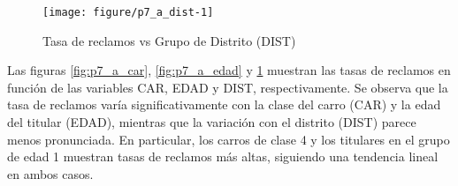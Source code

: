 \documentclass[paper=letter, fontsize=11pt, draft=false]{scrartcl}\usepackage[]{graphicx}\usepackage[]{xcolor}
\makeatletter
\def\maxwidth{ %
  \ifdim\Gin@nat@width>\linewidth
    \linewidth
  \else
    \Gin@nat@width
  \fi
}
\newenvironment{knitrout}{}{} %
\numberwithin{equation}{problemcounter} %
\numberwithin{figure}{problemcounter} %
\numberwithin{table}{problemcounter} %
\numberwithin{subsection}{problemcounter}
\makeatother
\begin{document}
\begin{knitrout}
\color{fgcolor}\begin{figure}[H]

{\centering \texttt{[image: figure/p7\_a\_dist-1]} 

}

\caption[Tasa de reclamos vs Grupo de Distrito (DIST)]{Tasa de reclamos vs Grupo de Distrito (DIST)}\label{fig:p7_a_dist}
\end{figure}

\end{knitrout}

Las figuras \ref{fig:p7_a_car}, \ref{fig:p7_a_edad} y \ref{fig:p7_a_dist} muestran las tasas de reclamos en función de las variables CAR, EDAD y DIST, respectivamente. Se observa que la tasa de reclamos varía significativamente con la clase del carro (CAR) y la edad del titular (EDAD), mientras que la variación con el distrito (DIST) parece menos pronunciada. En particular, los carros de clase 4 y los titulares en el grupo de edad 1 muestran tasas de reclamos más altas, siguiendo una tendencia lineal en ambos casos.
\end{document}

